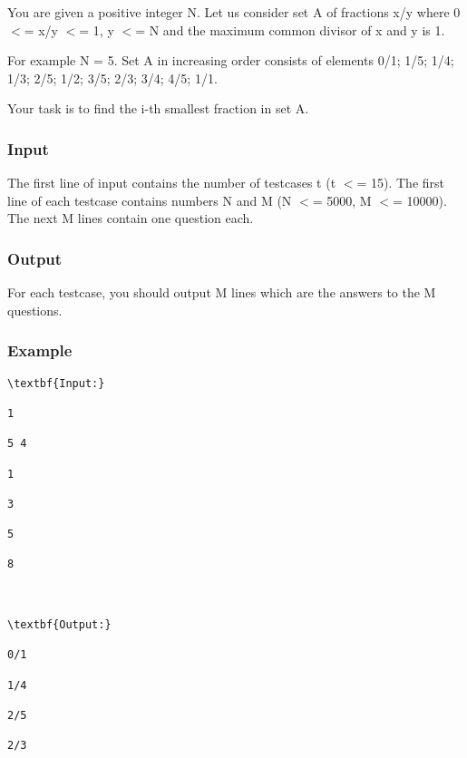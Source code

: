 

You are given a positive integer N. Let us consider set A of fractions x/y where 0 $<$= x/y $<$= 1, y $<$= N and the maximum common divisor of x and y is 1. 



 For example N = 5. Set A in increasing order consists of elements 0/1; 1/5; 1/4; 1/3; 2/5; 1/2; 3/5; 2/3; 3/4; 4/5; 1/1.



 Your task is to find the i-th smallest fraction in set A.

\subsubsection{Input}

The first line of input contains the number of testcases t (t $<$= 15). The first line of each testcase contains numbers N and M (N $<$= 5000, M $<$= 10000). The next M lines contain one question each.

 

\subsubsection{Output}

For each testcase, you should output M lines which are the answers to the M questions.

 

\subsubsection{Example}
\begin{verbatim}
\textbf{Input:}

1

5 4

1

3

5

8



\textbf{Output:}

0/1

1/4

2/5

2/3

\end{verbatim}
